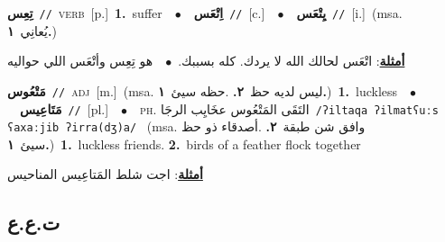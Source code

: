 \documentclass[10pt,a4paper,twoside]{article} %
\begin{document}
\begin{multicols}{2}
{\setlength\topsep{0pt}\textbf{\foreignlanguage{arabic}{تِعِس}}\ {\color{gray}\texttt{//}\color{black}}\ \textsc{verb}\ [p.]\ \textbf{1.}~suffer\ \ $\bullet$\ \ \setlength\topsep{0pt}\textbf{\foreignlanguage{arabic}{اِتْعَس}}\ {\color{gray}\texttt{//}\color{black}}\ [c.]\ \ $\bullet$\ \ \setlength\topsep{0pt}\textbf{\foreignlanguage{arabic}{يِتْعَس}}\ {\color{gray}\texttt{//}\color{black}}\ [i.]\ \color{gray}(msa. \foreignlanguage{arabic}{يُعانِي}~\foreignlanguage{arabic}{\textbf{١.}})\color{black}\  \begin{flushright}\color{gray}\foreignlanguage{arabic}{\textbf{\underline{\foreignlanguage{arabic}{أمثلة}}}: اتْعَس لحالك الله لا يردك. كله بسببك.\ $\bullet$\ \  هو تِعِس وأتْعَس اللي حواليه}\end{flushright}\color{black}} \vspace{2mm}

{\setlength\topsep{0pt}\textbf{\foreignlanguage{arabic}{مَتْعُوس}}\ {\color{gray}\texttt{//}\color{black}}\ \textsc{adj}\ [m.]\ \color{gray}(msa. \foreignlanguage{arabic}{ليس لديه حظ}~\foreignlanguage{arabic}{\textbf{٢.}}  .\foreignlanguage{arabic}{حظه سيئ}~\foreignlanguage{arabic}{\textbf{١.}})\color{black}\ \textbf{1.}~luckless\ \ $\bullet$\ \ \setlength\topsep{0pt}\textbf{\foreignlanguage{arabic}{مَتَاعِيس}}\ {\color{gray}\texttt{//}\color{black}}\ [pl.]\ \ $\bullet$\ \ \textsc{ph.} \color{gray} \foreignlanguage{arabic}{التَقَى المَتْعُوس عخَايِب الرجَا}\color{black}\ {\color{gray}\texttt{/{\sffamily ʔiltaqa ʔilmatʕuːs ʕaxaːjib ʔirra(dʒ)a}/}\color{black}}\ \color{gray} (msa. \foreignlanguage{arabic}{وافق شن طبقة}~\foreignlanguage{arabic}{\textbf{٢.}}  .\foreignlanguage{arabic}{أصدقاء ذو حظ سيئ}~\foreignlanguage{arabic}{\textbf{١.}})\color{black}\ \textbf{1.}~luckless friends.  \textbf{2.}~birds of a feather flock together\  \begin{flushright}\color{gray}\foreignlanguage{arabic}{\textbf{\underline{\foreignlanguage{arabic}{أمثلة}}}: اجت شلط المَتاعِيس المناحيس}\end{flushright}\color{black}} \vspace{2mm}

\vspace{-3mm}
\subsection*{\color{blue}\foreignlanguage{arabic}{ت.ع.ع}\color{blue}{}} 


\end{multicols}
\end{document}
